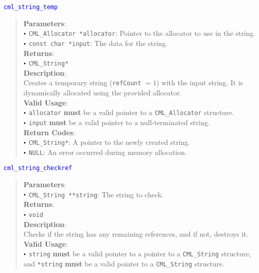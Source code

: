 \documentclass[a4paper,oneside,10pt]{article}
\newcommand{\function}[1]{
  \noindent\textcolor{blue}{\texttt{#1}}
  \vspace{-0.3em}
}
\renewcommand{\dot}{\raisebox{0.3ex}{\scalebox{0.6}{$\bullet$}}}
\theoremstyle{definition}
\begin{document}
\function{cml\_string\_temp}
\begin{quote}
  \textbf{Parameters}: \\
  $\dot$ \texttt{CML\_Allocator *allocator}: Pointer to the allocator to use in the string. \\
  $\dot$ \texttt{const char *input}: The data for the string. \\
  \textbf{Returns}: \\
  $\dot$ \texttt{CML\_String*} \\
  
  \vspace{-0.75em}
  \textbf{Description}: \\
  Creates a temporary string (\texttt{refCount} $=1$) with the input string. It is dynamically allocated using the provided allocator. \\

  \vspace{-0.75em}
  \textbf{Valid Usage}: \\
  $\dot$ \texttt{allocator} \textbf{must} be a valid pointer to a \texttt{CML\_Allocator} structure. \\
  $\dot$ \texttt{input} \textbf{must} be a valid pointer to a null-terminated string. \\

  \vspace{-0.75em}
  \textbf{Return Codes}: \\
  $\dot$ \texttt{CML\_String*}: A pointer to the newly created string. \\
  $\dot$ \texttt{NULL}: An error occurred during memory allocation. \\
\end{quote}

\function{cml\_string\_checkref}
\begin{quote}
  \textbf{Parameters}: \\
  $\dot$ \texttt{CML\_String **string}: The string to check. \\
  \textbf{Returns}: \\
  $\dot$ \texttt{void} \\
  
  \vspace{-0.75em}
  \textbf{Description}: \\
  Checks if the string has any remaining references, and if not, destroys it. \\

  \vspace{-0.75em}
  \textbf{Valid Usage}: \\
  $\dot$ \texttt{string} \textbf{must} be a valid pointer to a pointer to a \texttt{CML\_String} structure, and \texttt{*string} \textbf{must} be a valid pointer to a \texttt{CML\_String} structure. \\
\end{quote}
\end{document}

